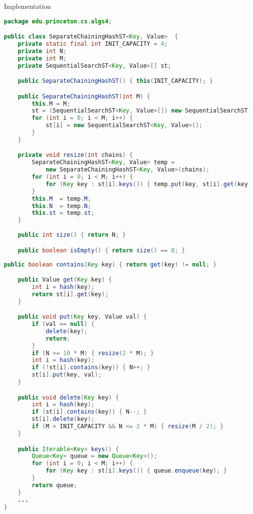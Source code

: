 \documentclass[8pt,a4paper,compress]{beamer}
\begin{document}
\begin{frame}[fragile]
Implementation
\begin{lstlisting}[language=Java]
package edu.princeton.cs.algs4;

public class SeparateChainingHashST<Key, Value>  {
    private static final int INIT_CAPACITY = 4;
    private int N;
    private int M; 
    private SequentialSearchST<Key, Value>[] st; 

    public SeparateChainingHashST() { this(INIT_CAPACITY); } 

    public SeparateChainingHashST(int M) {
        this.M = M;
        st = (SequentialSearchST<Key, Value>[]) new SequentialSearchST[M];
        for (int i = 0; i < M; i++) { 
            st[i] = new SequentialSearchST<Key, Value>(); 
        }
    } 

    private void resize(int chains) {
        SeparateChainingHashST<Key, Value> temp = 
            new SeparateChainingHashST<Key, Value>(chains);
        for (int i = 0; i < M; i++) {
            for (Key key : st[i].keys()) { temp.put(key, st[i].get(key)); }
        }
        this.M  = temp.M;
        this.N  = temp.N;
        this.st = temp.st;
    }
    
    public int size() { return N; } 

    public boolean isEmpty() { return size() == 0; }
\end{lstlisting}
\end{frame}

\begin{frame}[fragile]
\begin{lstlisting}[language=Java]
    public boolean contains(Key key) { return get(key) != null; } 

    public Value get(Key key) {
        int i = hash(key);
        return st[i].get(key);
    } 

    public void put(Key key, Value val) {
        if (val == null) {
            delete(key);
            return;
        }
        if (N >= 10 * M) { resize(2 * M); }
        int i = hash(key);
        if (!st[i].contains(key)) { N++; }
        st[i].put(key, val);
    } 

    public void delete(Key key) {
        int i = hash(key);
        if (st[i].contains(key)) { N--; }
        st[i].delete(key);
        if (M > INIT_CAPACITY && N <= 2 * M) { resize(M / 2); }
    } 

    public Iterable<Key> keys() {
        Queue<Key> queue = new Queue<Key>();
        for (int i = 0; i < M; i++) {
            for (Key key : st[i].keys()) { queue.enqueue(key); }
        }
        return queue;
    } 
    ...
}
\end{lstlisting}
\end{frame}
\end{document}

